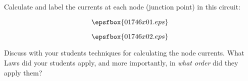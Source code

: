 

Calculate and label the currents at each node (junction point) in this circuit:

$$\epsfbox{01746x01.eps}$$







$$\epsfbox{01746x02.eps}$$







Discuss with your students techniques for calculating the node currents.  What Laws did your students apply, and more importantly, in {\it what order} did they apply them?




